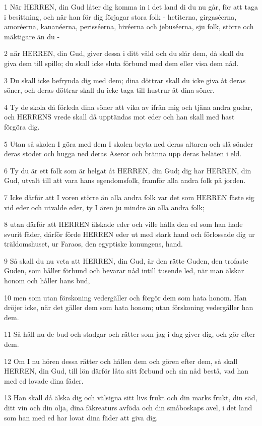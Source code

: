 \par 1 När HERREN, din Gud låter dig komma in i det land di du nu går, för att taga i besittning, och när han för dig förjagar stora folk - hetiterna, girgaséerna, amoréerna, kananéerna, perisséerna, hivéerna och jebuséerna, sju folk, större och mäktigare än du -
\par 2 när HERREN, din Gud, giver dessa i ditt våld och du slår dem, då skall du giva dem till spillo; du skall icke sluta förbund med dem eller visa dem nåd.
\par 3 Du skall icke befrynda dig med dem; dina döttrar skall du icke giva åt deras söner, och deras döttrar skall du icke taga till hustrur åt dina söner.
\par 4 Ty de skola då förleda dina söner att vika av ifrån mig och tjäna andra gudar, och HERRENS vrede skall då upptändas mot eder och han skall med hast förgöra dig.
\par 5 Utan så skolen I göra med dem I skolen bryta ned deras altaren och slå sönder deras stoder och hugga ned deras Aseror och bränna upp deras beläten i eld.
\par 6 Ty du är ett folk som är helgat åt HERREN, din Gud; dig har HERREN, din Gud, utvalt till att vara hans egendomsfolk, framför alla andra folk på jorden.
\par 7 Icke därför att I voren större än alla andra folk var det som HERREN fäste sig vid eder och utvalde eder, ty I ären ju mindre än alla andra folk;
\par 8 utan därför att HERREN älskade eder och ville hålla den ed som han hade svurit fäder, därför förde HERREN eder ut med stark hand och förlossade dig ur träldomshuset, ur Faraos, den egyptiske konungens, hand.
\par 9 Så skall du nu veta att HERREN, din Gud, är den rätte Guden, den trofaste Guden, som håller förbund och bevarar nåd intill tusende led, när man älskar honom och håller hans bud,
\par 10 men som utan förskoning vedergäller och förgör dem som hata honom. Han dröjer icke, när det gäller dem som hata honom; utan förskoning vedergäller han dem.
\par 11 Så håll nu de bud och stadgar och rätter som jag i dag giver dig, och gör efter dem.
\par 12 Om I nu hören dessa rätter och hållen dem och gören efter dem, så skall HERREN, din Gud, till lön därför låta sitt förbund och sin nåd bestå, vad han med ed lovade dina fäder.
\par 13 Han skall då älska dig och välsigna sitt livs frukt och din marks frukt, din säd, ditt vin och din olja, dina fäkreaturs avföda och din småboskaps avel, i det land som han med ed har lovat dina fäder att giva dig.
